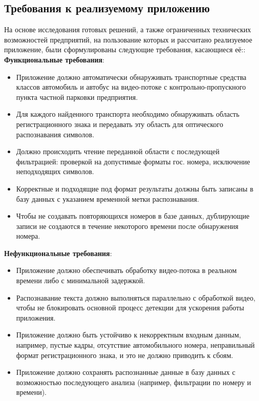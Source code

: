 \documentclass[a4paper,12pt]{article}
\begin{document}
\subsection{Требования к реализуемому приложению}

На основе исследования готовых решений, а также ограниченных технических возможностей предприятий, на пользование которых и рассчитано реализуемое приложение, были сформулированы следующие требования, касающиеся её::
\textbf{Функциональные требования}:
\begin{itemize}
    \item Приложение должно автоматически обнаруживать транспортные средства классов автомобиль и автобус на видео-потоке с контрольно-пропускного пункта частной парковки предприятия.
    \item Для каждого найденного транспорта необходимо обнаруживать область регистрационного знака и передавать эту область для оптического распознавания символов.
    \item Должно происходить чтение переданной области с последующей фильтрацией: проверкой на допустимые форматы гос. номера, исключение неподходящих символов. 
    \item Корректные и подходящие под формат результаты должны быть записаны в базу данных с указанием временной метки распознавания.
    \item Чтобы не создавать повторяющихся номеров в базе данных, дублирующие записи не создаются в течение некоторого времени после обнаружения номера.
\end{itemize}

\textbf{Нефункциональные требования}:
\begin{itemize}
\item Приложение должно обеспечивать обработку видео-потока в реальном времени либо с минимальной задержкой.
\item Распознавание текста должно выполняться параллельно с обработкой видео, чтобы не блокировать основной процесс детекции для ускорения работы приложения.
\item Приложение должно быть устойчиво к некорректным входным данным, например, пустые кадры, отсутствие автомобильного номера, неправильный формат регистрационного знака, и это не должно приводить к сбоям.
\item Приложение должно сохранять распознанные данные в базу данных с возможностью последующего анализа (например, фильтрации по номеру и времени).
\end{itemize}
\end{document}
